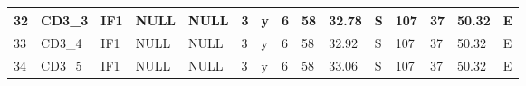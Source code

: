 {\begin{table}[]
\begin{tabular}{|l|l|l|l|l|l|l|l|l|l|l|l|l|l|l|}
		32                                & CD3\_3                                    & IF1                                       & NULL                            & NULL                            & 3                               & y                                    & 6                                                                                    & 58                                                                                   & 32.78                                                                                & S                                                                                 & 107                                                                                   & 37                                                                                    & 50.32                                                                                 & E                                                                                  \\ \hline
		33                                & CD3\_4                                    & IF1                                       & NULL                            & NULL                            & 3                               & y                                    & 6                                                                                    & 58                                                                                   & 32.92                                                                                & S                                                                                 & 107                                                                                   & 37                                                                                    & 50.32                                                                                 & E                                                                                  \\ \hline
		34                                & CD3\_5                                    & IF1                                       & NULL                            & NULL                            & 3                               & y                                    & 6                                                                                    & 58                                                                                   & 33.06                                                                                & S                                                                                 & 107                                                                                   & 37                                                                                    & 50.32                                                                                 & E                                                                                  \\ \hline

\end{tabular}
\end{table}}
